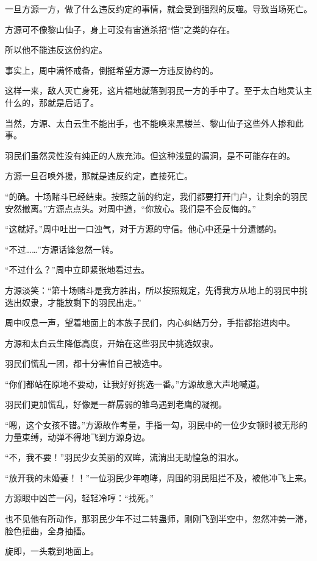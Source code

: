 \begin{this_body}
一旦方源一方，做了什么违反约定的事情，就会受到强烈的反噬。导致当场死亡。

方源可不像黎山仙子，身上可没有宙道杀招“恺”之类的存在。

所以他不能违反这份约定。

事实上，周中满怀戒备，倒挺希望方源一方违反协约的。

这样一来，敌人灭亡身死，这片福地就落到羽民一方的手中了。至于太白地灵认主什么的，那就是后话了。

当然，方源、太白云生不能出手，也不能唤来黑楼兰、黎山仙子这些外人掺和此事。

羽民们虽然灵性没有纯正的人族充沛。但这种浅显的漏洞，是不可能存在的。

方源一旦召唤外援，那就是违反约定，直接死亡。

“的确。十场赌斗已经结束。按照之前的约定，我们都要打开门户，让剩余的羽民安然撤离。”方源点点头。对周中道，“你放心。我们是不会反悔的。”

“这就好。”周中吐出一口浊气，对于方源的守信。他心中还是十分遗憾的。

“不过……”方源话锋忽然一转。

“不过什么？”周中立即紧张地看过去。

方源淡笑：“第十场赌斗是我方胜出，所以按照规定，先得我方从地上的羽民中挑选出奴隶，才能放剩下的羽民出走。”

周中叹息一声，望着地面上的本族子民们，内心纠结万分，手指都掐进肉中。

方源和太白云生降低高度，开始在这些羽民中挑选奴隶。

羽民们慌乱一团，都十分害怕自己被选中。

“你们都站在原地不要动，让我好好挑选一番。”方源故意大声地喊道。

羽民们更加慌乱，好像是一群孱弱的雏鸟遇到老鹰的凝视。

“嗯，这个女孩不错。”方源故作考量，手指一勾，羽民中的一位少女顿时被无形的力量束缚，动弹不得地飞到方源身边。

“不，我不要！”羽民少女美丽的双眸，流淌出无助惶急的泪水。

“放开我的未婚妻！！”一位羽民少年咆哮，周围的羽民阻拦不及，被他冲飞上来。

方源眼中凶芒一闪，轻轻冷哼：“找死。”

也不见他有所动作，那羽民少年不过二转蛊师，刚刚飞到半空中，忽然冲势一滞，脸色扭曲，全身抽搐。

旋即，一头栽到地面上。


\end{this_body}
